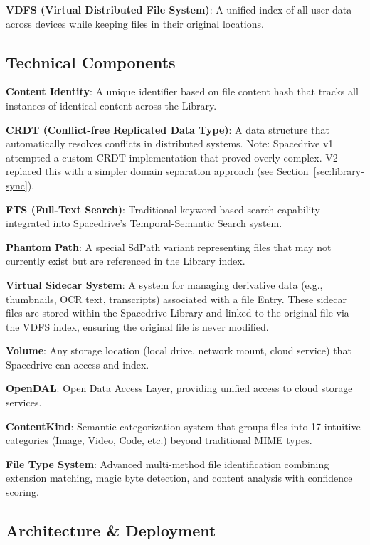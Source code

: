 \documentclass[sigconf]{acmart}
\begin{document}
\textbf{VDFS (Virtual Distributed File System)}: A unified index of all user data across devices while keeping files in their original locations.

\subsection*{Technical Components}

\textbf{Content Identity}: A unique identifier based on file content hash that tracks all instances of identical content across the Library.

\textbf{CRDT (Conflict-free Replicated Data Type)}: A data structure that automatically resolves conflicts in distributed systems. Note: Spacedrive v1 attempted a custom CRDT implementation that proved overly complex. V2 replaced this with a simpler domain separation approach (see Section~\ref{sec:library-sync}).

\textbf{FTS (Full-Text Search)}: Traditional keyword-based search capability integrated into Spacedrive's Temporal-Semantic Search system.

\textbf{Phantom Path}: A special SdPath variant representing files that may not currently exist but are referenced in the Library index.

\textbf{Virtual Sidecar System}: A system for managing derivative data (e.g., thumbnails, OCR text, transcripts) associated with a file Entry. These sidecar files are stored within the Spacedrive Library and linked to the original file via the VDFS index, ensuring the original file is never modified.

\textbf{Volume}: Any storage location (local drive, network mount, cloud service) that Spacedrive can access and index.

\textbf{OpenDAL}: Open Data Access Layer, providing unified access to cloud storage services.

\textbf{ContentKind}: Semantic categorization system that groups files into 17 intuitive categories (Image, Video, Code, etc.) beyond traditional MIME types.

\textbf{File Type System}: Advanced multi-method file identification combining extension matching, magic byte detection, and content analysis with confidence scoring.

\subsection*{Architecture \& Deployment}
\end{document}

